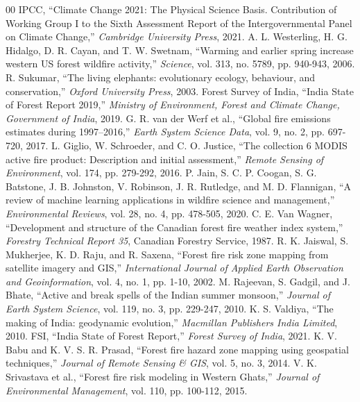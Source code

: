 \documentclass[journal, 10pt, twocolumn]{IEEEtran}
\begin{document}
\begin{thebibliography}{00}
 IPCC, ``Climate Change 2021: The Physical Science Basis. Contribution of Working Group I to the Sixth Assessment Report of the Intergovernmental Panel on Climate Change,'' \textit{Cambridge University Press}, 2021.
 A. L. Westerling, H. G. Hidalgo, D. R. Cayan, and T. W. Swetnam, ``Warming and earlier spring increase western US forest wildfire activity,'' \textit{Science}, vol. 313, no. 5789, pp. 940-943, 2006.
 R. Sukumar, ``The living elephants: evolutionary ecology, behaviour, and conservation,'' \textit{Oxford University Press}, 2003.
 Forest Survey of India, ``India State of Forest Report 2019,'' \textit{Ministry of Environment, Forest and Climate Change, Government of India}, 2019.
 G. R. van der Werf et al., ``Global fire emissions estimates during 1997–2016,'' \textit{Earth System Science Data}, vol. 9, no. 2, pp. 697-720, 2017.
 L. Giglio, W. Schroeder, and C. O. Justice, ``The collection 6 MODIS active fire product: Description and initial assessment,'' \textit{Remote Sensing of Environment}, vol. 174, pp. 279-292, 2016.
 P. Jain, S. C. P. Coogan, S. G. Batstone, J. B. Johnston, V. Robinson, J. R. Rutledge, and M. D. Flannigan, ``A review of machine learning applications in wildfire science and management,'' \textit{Environmental Reviews}, vol. 28, no. 4, pp. 478-505, 2020.
 C. E. Van Wagner, ``Development and structure of the Canadian forest fire weather index system,'' \textit{Forestry Technical Report 35}, Canadian Forestry Service, 1987.
 R. K. Jaiswal, S. Mukherjee, K. D. Raju, and R. Saxena, ``Forest fire risk zone mapping from satellite imagery and GIS,'' \textit{International Journal of Applied Earth Observation and Geoinformation}, vol. 4, no. 1, pp. 1-10, 2002.
 M. Rajeevan, S. Gadgil, and J. Bhate, ``Active and break spells of the Indian summer monsoon,'' \textit{Journal of Earth System Science}, vol. 119, no. 3, pp. 229-247, 2010.
 K. S. Valdiya, ``The making of India: geodynamic evolution,'' \textit{Macmillan Publishers India Limited}, 2010.
 FSI, ``India State of Forest Report,'' \textit{Forest Survey of India}, 2021.
 K. V. Babu and K. V. S. R. Prasad, ``Forest fire hazard zone mapping using geospatial techniques,'' \textit{Journal of Remote Sensing \& GIS}, vol. 5, no. 3, 2014.
 V. K. Srivastava et al., ``Forest fire risk modeling in Western Ghats,'' \textit{Journal of Environmental Management}, vol. 110, pp. 100-112, 2015.

\end{thebibliography}
\end{document}
